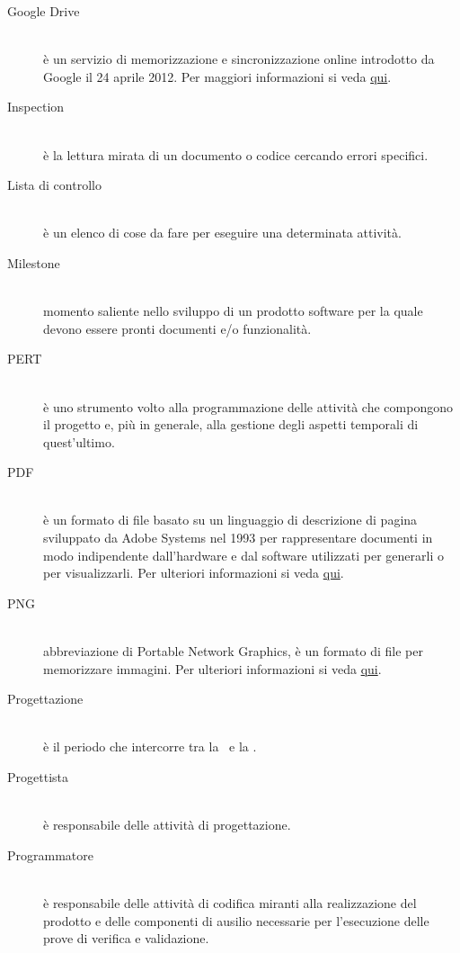 \documentclass[12pt,a4paper]{article}
\begin{document}
\begin{description}
\item[Google Drive] 
\hfill\\ è un servizio di memorizzazione e sincronizzazione online introdotto da Google il 24 aprile 2012. Per maggiori informazioni si veda \href{https://it.wikipedia.org/wiki/Google_Drive}{qui}.

\item[Inspection] 
\hfill\\ è la lettura mirata di un documento o codice cercando errori specifici.

\item[Lista di controllo] 
\hfill\\ è un elenco di cose da fare per eseguire una determinata attività.

\item[Milestone] 
\hfill\\ momento saliente nello sviluppo di un prodotto software per la quale devono essere pronti documenti e/o funzionalità.

\item[PERT] 
\hfill\\ è uno strumento volto alla programmazione delle attività che compongono il progetto e, più in generale, alla gestione degli aspetti temporali di quest'ultimo.

\item[PDF] 
\hfill\\ è un formato di file basato su un linguaggio di descrizione di pagina sviluppato da Adobe Systems nel 1993 per rappresentare documenti in modo indipendente dall’hardware e dal software utilizzati per generarli o per visualizzarli. Per ulteriori informazioni si veda \href{http://it.wikipedia.org/wiki/Portable_Document_Format}{qui}.

\item[PNG] 
\hfill\\ abbreviazione di Portable Network Graphics, è un formato di file per memorizzare immagini. Per ulteriori informazioni si veda \href{http://it.wikipedia.org/wiki/Portable_Network_Graphics}{qui}.

\item[Progettazione] 
\hfill\\ è il periodo che intercorre tra la \RR\ e la \RP.

\item[Progettista] 
\hfill\\ è responsabile delle attività di progettazione.

\item[Programmatore] 
\hfill\\ è responsabile delle attività di codifica miranti alla realizzazione del prodotto e delle componenti di ausilio necessarie per l'esecuzione delle prove di verifica e validazione.


\end{description}
\end{document}

